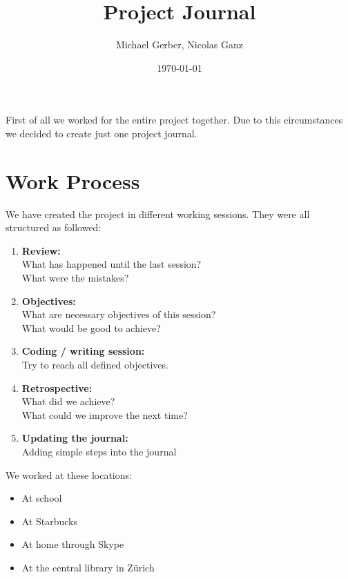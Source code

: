 %
%
%
%







\title{Project Journal} %
\author{Michael Gerber, Nicolas Ganz } %
\date{\today}
\maketitle %

First of all we worked for the entire project together. Due to this circumstances we decided to create just one project journal.

\section*{Work Process}
We have created the project in different working sessions. They were all structured as followed:
\begin{enumerate}
  \item \textbf{Review:}\\
    What has happened until the last session?\\
    What were the mistakes?
  \item \textbf{Objectives:}\\
    What are necessary objectives of this session?\\
    What would be good to achieve?
  \item \textbf{Coding / writing session:}\\
    Try to reach all defined objectives.
  \item \textbf{Retrospective:}\\
    What did we achieve?\\
    What could we improve the next time?
  \item \textbf{Updating the journal:}\\
    Adding simple steps into the journal
\end{enumerate}

We worked at these locations:
\begin{itemize}
  \item At school
  \item At Starbucks
  \item At home through Skype
  \item At the central library in Zürich
\end{itemize}

